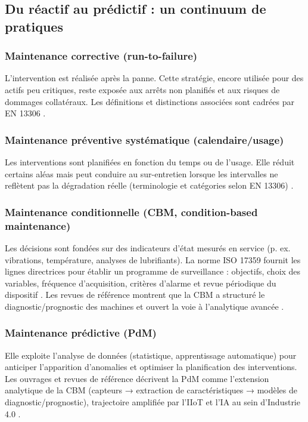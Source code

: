 \subsection{Du réactif au prédictif : un continuum de pratiques}

\subsubsection{Maintenance corrective (run-to-failure)}
L'intervention est réalisée après la panne. Cette stratégie, encore utilisée pour des actifs peu critiques, reste exposée aux arrêts non planifiés et aux risques de dommages collatéraux. Les définitions et distinctions associées sont cadrées par EN 13306 \cite{en13306}.

\subsubsection{Maintenance préventive systématique (calendaire/usage)}
Les interventions sont planifiées en fonction du temps ou de l'usage. Elle réduit certains aléas mais peut conduire au sur-entretien lorsque les intervalles ne reflètent pas la dégradation réelle (terminologie et catégories selon EN 13306) \cite{en13306}.

\subsubsection{Maintenance conditionnelle (CBM, condition-based maintenance)}
Les décisions sont fondées sur des indicateurs d'état mesurés en service (p. ex. vibrations, température, analyses de lubrifiants). La norme ISO 17359 fournit les lignes directrices pour établir un programme de surveillance : objectifs, choix des variables, fréquence d'acquisition, critères d'alarme et revue périodique du dispositif \cite{iso17359}. Les revues de référence montrent que la CBM a structuré le diagnostic/prognostic des machines et ouvert la voie à l'analytique avancée \cite{jardine2006,lee2014,hector2024,achouch2022}.

\subsubsection{Maintenance prédictive (PdM)}
Elle exploite l'analyse de données (statistique, apprentissage automatique) pour anticiper l'apparition d'anomalies et optimiser la planification des interventions. Les ouvrages et revues de référence décrivent la PdM comme l'extension analytique de la CBM (capteurs → extraction de caractéristiques → modèles de diagnostic/prognostic), trajectoire amplifiée par l'IIoT et l'IA au sein d'Industrie 4.0 \cite{mobley2002,lee2014,lasi2014,kagermann2013,hector2024,achouch2022}.

